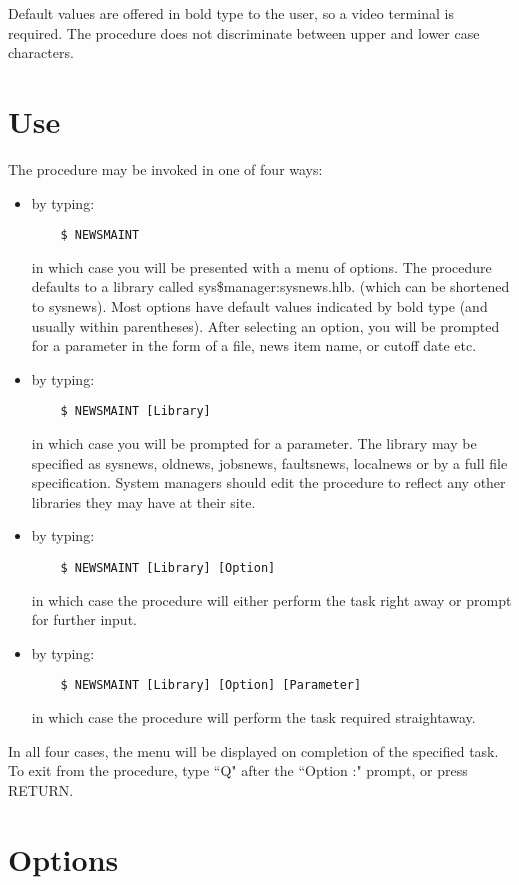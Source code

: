 Default values are offered in bold type to the user, so a video terminal is
required. The procedure does not discriminate between upper and lower case
characters.

\section{Use}

The procedure may be invoked in one of four ways:
\begin{itemize}
\item by typing:
\begin{verbatim}
    $ NEWSMAINT
\end{verbatim}
in which case you will be presented with a menu of options. The procedure
defaults to a library called sys\$manager:sysnews.hlb. (which can be shortened
to sysnews).
Most options have default values indicated by bold type (and usually within 
parentheses).
After selecting an option, you will be prompted for a parameter in the form of
a file, news item name, or cutoff date etc.
\item by typing:
\begin{verbatim}
    $ NEWSMAINT [Library]
\end{verbatim}
in which case you will be prompted for a parameter. The library may be 
specified as sysnews, oldnews, jobsnews, faultsnews, localnews or by 
a full file specification. System managers should edit the procedure to 
reflect any other libraries they may have at their site.
\item by typing:
\begin{verbatim}
    $ NEWSMAINT [Library] [Option]
\end{verbatim}
in which case the procedure will either perform the task right away or
prompt for further input.
\item by typing:
\begin{verbatim}
    $ NEWSMAINT [Library] [Option] [Parameter]
\end{verbatim}
in which case the procedure will perform the task required straightaway.
\end{itemize}
In all four cases, the menu will be displayed on completion of the specified
task.
To exit from the procedure, type ``Q" after the ``Option :" prompt, or press
RETURN.

\section{Options}

